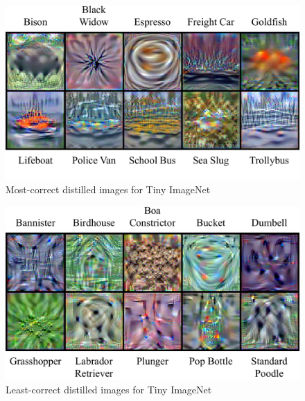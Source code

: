 \begin{figure}
    \centering
    \includegraphics[width=\linewidth]{figures/Tiny_Good.pdf}
    \vspace{-20pt}
    \caption{Most-correct distilled images for Tiny ImageNet }
    \label{fig:tinygood}
    \vspace{-8pt}
\end{figure}
\begin{figure}
    \centering
    \includegraphics[width=\linewidth]{figures/Tiny_Bad.pdf}
    \vspace{-8pt}
    \caption{Least-correct distilled images for Tiny ImageNet }
    \label{fig:tinybad}
    \vspace{-8pt}
\end{figure}


\clearpage

